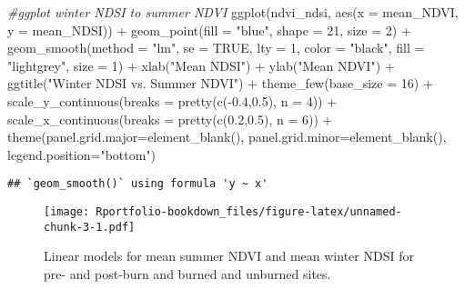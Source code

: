 \documentclass[
]{book}
\newenvironment{Shaded}{\begin{snugshade}}{\end{snugshade}}
\newcommand{\AttributeTok}[1]{\textcolor[rgb]{0.77,0.63,0.00}{#1}}
\newcommand{\CommentTok}[1]{\textcolor[rgb]{0.56,0.35,0.01}{\textit{#1}}}
\newcommand{\ConstantTok}[1]{\textcolor[rgb]{0.00,0.00,0.00}{#1}}
\newcommand{\DecValTok}[1]{\textcolor[rgb]{0.00,0.00,0.81}{#1}}
\newcommand{\FloatTok}[1]{\textcolor[rgb]{0.00,0.00,0.81}{#1}}
\newcommand{\FunctionTok}[1]{\textcolor[rgb]{0.00,0.00,0.00}{#1}}
\newcommand{\NormalTok}[1]{#1}
\newcommand{\SpecialCharTok}[1]{\textcolor[rgb]{0.00,0.00,0.00}{#1}}
\newcommand{\StringTok}[1]{\textcolor[rgb]{0.31,0.60,0.02}{#1}}
\begin{document}
\begin{Shaded}
\begin{Highlighting}[]
\CommentTok{\#ggplot winter NDSI to summer NDVI}
\FunctionTok{ggplot}\NormalTok{(ndvi\_ndsi, }\FunctionTok{aes}\NormalTok{(}\AttributeTok{x =}\NormalTok{ mean\_NDVI, }\AttributeTok{y =}\NormalTok{ mean\_NDSI)) }\SpecialCharTok{+}
  \FunctionTok{geom\_point}\NormalTok{(}\AttributeTok{fill =} \StringTok{"blue"}\NormalTok{, }
             \AttributeTok{shape =} \DecValTok{21}\NormalTok{, }
             \AttributeTok{size =} \DecValTok{2}\NormalTok{) }\SpecialCharTok{+}
  \FunctionTok{geom\_smooth}\NormalTok{(}\AttributeTok{method =} \StringTok{"lm"}\NormalTok{,}
              \AttributeTok{se =} \ConstantTok{TRUE}\NormalTok{,}
              \AttributeTok{lty =} \DecValTok{1}\NormalTok{,}
              \AttributeTok{color =} \StringTok{"black"}\NormalTok{,}
              \AttributeTok{fill =} \StringTok{"lightgrey"}\NormalTok{,}
              \AttributeTok{size =} \DecValTok{1}\NormalTok{) }\SpecialCharTok{+}
  \FunctionTok{xlab}\NormalTok{(}\StringTok{"Mean NDSI"}\NormalTok{) }\SpecialCharTok{+} \FunctionTok{ylab}\NormalTok{(}\StringTok{"Mean NDVI"}\NormalTok{) }\SpecialCharTok{+}
  \FunctionTok{ggtitle}\NormalTok{(}\StringTok{"Winter NDSI vs. Summer NDVI"}\NormalTok{) }\SpecialCharTok{+}
  \FunctionTok{theme\_few}\NormalTok{(}\AttributeTok{base\_size =} \DecValTok{16}\NormalTok{) }\SpecialCharTok{+}
  \FunctionTok{scale\_y\_continuous}\NormalTok{(}\AttributeTok{breaks =} \FunctionTok{pretty}\NormalTok{(}\FunctionTok{c}\NormalTok{(}\SpecialCharTok{{-}}\FloatTok{0.4}\NormalTok{,}\FloatTok{0.5}\NormalTok{), }\AttributeTok{n =} \DecValTok{4}\NormalTok{)) }\SpecialCharTok{+}
  \FunctionTok{scale\_x\_continuous}\NormalTok{(}\AttributeTok{breaks =} \FunctionTok{pretty}\NormalTok{(}\FunctionTok{c}\NormalTok{(}\FloatTok{0.2}\NormalTok{,}\FloatTok{0.5}\NormalTok{), }\AttributeTok{n =} \DecValTok{6}\NormalTok{)) }\SpecialCharTok{+}
  \FunctionTok{theme}\NormalTok{(}\AttributeTok{panel.grid.major=}\FunctionTok{element\_blank}\NormalTok{(), }\AttributeTok{panel.grid.minor=}\FunctionTok{element\_blank}\NormalTok{(), }\AttributeTok{legend.position=}\StringTok{"bottom"}\NormalTok{)}
\end{Highlighting}
\end{Shaded}

\begin{verbatim}
## `geom_smooth()` using formula 'y ~ x'
\end{verbatim}

\begin{figure}
\centering
\texttt{[image: Rportfolio-bookdown\_files/figure-latex/unnamed-chunk-3-1.pdf]}
\caption{\label{fig:unnamed-chunk-3}Linear models for mean summer NDVI and mean winter NDSI for pre- and post-burn and burned and unburned sites.}
\end{figure}
\end{document}
